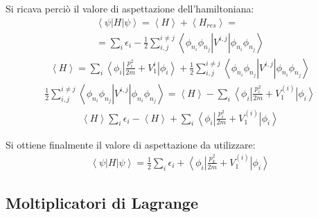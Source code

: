 Si ricava perciò il valore di aspettazione dell'hamiltoniana:
\begin{equation}\begin{split}
\left\langle \psi \right |H\left |\psi  \right\rangle=\left\langle H \right\rangle+\left\langle H_{res} \right\rangle=\\
=\sum_i{\epsilon_i}-\frac{1}{2}\sum_{i,j}^{i\neq j}{\left\langle \phi_{n_i}\phi_{n_j}\right |V^{i,j}\left |\phi_{n_i}\phi_{n_j} \right\rangle}
\end{split}\end{equation}
\begin{equation}\begin{split}
\left\langle H \right\rangle=\sum_i{\left\langle \phi_i\right |\frac{p_i^2}{2m}+V_1^{i}\left |\phi_i \right\rangle}+\frac{1}{2}\sum_{i,j}^{i\neq j}{\left\langle \phi_{n_i}\phi_{n_j}\right |V^{i,j}\left |\phi_{n_i}\phi_{n_j} \right\rangle}
\end{split}\end{equation}
\begin{equation}\begin{split}
\frac{1}{2}\sum_{i,j}^{i\neq j}{\left\langle \phi_{n_i}\phi_{n_j}\right |V^{i,j}\left |\phi_{n_i}\phi_{n_j} \right\rangle}=\left\langle H \right\rangle-\sum_i{\left\langle \phi_i\right |\frac{p_i^2}{2m}+V_1^{\left(i\right)}\left |\phi_i \right\rangle}
\end{split}\end{equation}
\begin{equation}\begin{split}
\left\langle H \right\rangle\sum_i{\epsilon_i}-\left\langle H \right\rangle+\sum_i{\left\langle \phi_i\right |\frac{p_i^2}{2m}+V_1^{\left(i\right)}\left |\phi_i \right\rangle}
\end{split}\end{equation}

Si ottiene finalmente il valore di aspettazione da utilizzare:
\begin{equation}\begin{split}
\left\langle \psi \right |H\left |\psi  \right\rangle=\frac{1}{2}\sum_i{\epsilon_i+\left\langle \phi_i\right |\frac{p_k^2}{2m}+V_1^{\left(i\right)}\left |\phi_i \right\rangle}
\end{split}\end{equation}

\subsection{Moltiplicatori di Lagrange} %

